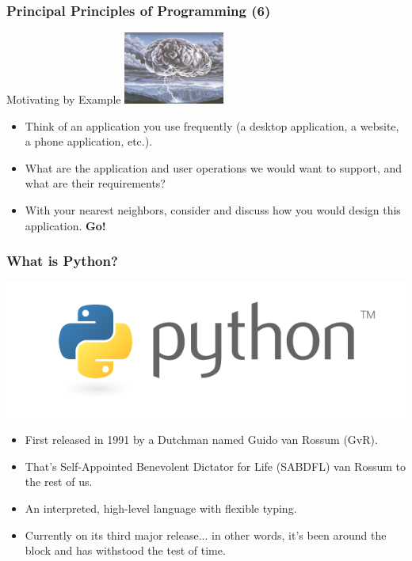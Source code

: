 \documentclass[10pt]{beamer}
\begin{document}
\begin{frame}
  \frametitle{Principal Principles of Programming (6)}
  \begin{block}{Motivating by Example}
    \centering
    \vspace{10px}
    \includegraphics[width=125px]{Brainstorm.jpg}
    \vspace{5px}
    \begin{itemize}
      \item Think of an application you use frequently (a desktop application, a website, a phone application, etc.).
      \item What are the application and user operations we would want to support, and what are their requirements?
      \item With your nearest neighbors, consider and discuss how you would design this application.
        \textbf{Go!}
    \end{itemize}
  \end{block}
\end{frame}

\begin{frame}
  \frametitle{What is Python?}
  \centering
  \includegraphics[scale=0.5]{PythonLogo.png} \\
  \begin{itemize}
    \item First released in 1991 by a Dutchman named Guido van Rossum (GvR).
    \item That's Self-Appointed Benevolent Dictator for Life (SABDFL) van Rossum to the rest of us.
    \item An interpreted, high-level language with flexible typing.
    \item Currently on its third major release... in other words, it's been around the block and has withstood the test of time.
  \end{itemize}
\end{frame}
\end{document}
